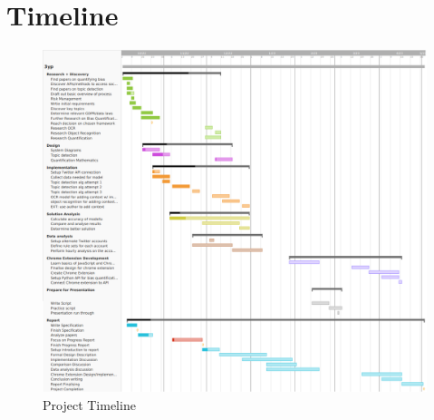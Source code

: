 \documentclass[a4paper,fleqn,10pt]{article}
\begin{document}
\section{Timeline}
\label{sec:timeline}
\begin{figure}[htbp]
    \includegraphics[width=150mm]{../images/3yp timeline v2.png}
    \caption{Project Timeline}
    \label{fig:timeline}
\end{figure}
\end{document}
